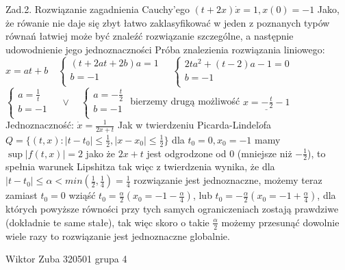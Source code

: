 \documentclass{article}
\begin{document}
Zad.2.
\newline
\newline
Rozwiązanie zagadnienia Cauchy'ego
$
(t+2x)\dot{x}=1,x(0)=-1
$\newline
Jako, że rówanie nie daje się zbyt łatwo zaklasyfikować w jeden z poznanych typów równań
łatwiej może być znaleźć rozwiązanie szczególne, a następnie udowodnienie jego jednoznaczności\newline
Próba znalezienia rozwiązania liniowego:
$
x=at+b\quad 
\left\{\begin{array}{cc}
(t+2at+2b)a=1\\b=-1\\
\end{array}\right.
\quad
\left\{\begin{array}{cc}
2ta^2+(t-2)a-1=0\\b=-1\\
\end{array}\right.
$
\newline
$
\left\{\begin{array}{cc}
a=\frac{1}{t}\\b=-1\\
\end{array}\right.
\quad\vee\quad
\left\{\begin{array}{cc}
a=-\frac{t}{2}\\b=-1\\
\end{array}\right.
$
bierzemy drugą możliwość
$
\underline{x=-\frac{t}{2}-1}
$\newline
Jednoznaczność:
$
\dot{x}=\frac{1}{2x+t}
$
Jak w twierdzeniu Picarda-Lindel$\ddot{o}$fa $Q=\{(t,x):|t-t_0|\le\frac{1}{2},|x-x_0|\le\frac{1}{2}\}$
dla $t_0=0,x_0=-1$ mamy $\sup|f(t,x)|=2$ jako że $2x+t$ jest odgrodzone od 0 (mniejsze niż $-\frac{1}{2}$), to spełnia warunek Lipshitza
tak więc z twierdzenia wynika, że dla $|t-t_0|\le\alpha<min(\frac{1}{2},\frac{1}{4})=\frac{1}{4}$ rozwiązanie jest jednoznaczne, możemy teraz zamiast 
$t_0=0$ wziąść $t_0=\frac{\alpha}{2}(x_0=-1-\frac{\alpha}{4})$, lub $t_0=-\frac{\alpha}{2}(x_0=-1+\frac{\alpha}{4})$,
dla których powyższe równości przy tych samych ograniczeniach zostają prawdziwe (dokładnie te same stałe), tak więc skoro o takie $\frac{\alpha}{2}$
możemy przesunąć dowolnie wiele razy to rozwiązanie jest jednoznaczne globalnie.
\newpage

Wiktor Zuba 320501 grupa 4
\newline
\end{document}
